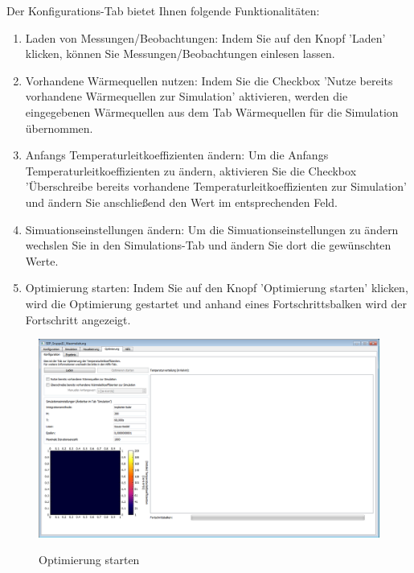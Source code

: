 Der Konfigurations-Tab bietet Ihnen folgende Funktionalitäten:\\
\begin{enumerate}
\item Laden von Messungen/Beobachtungen: Indem Sie auf den Knopf 'Laden' klicken, können Sie Messungen/Beobachtungen einlesen lassen.
\item Vorhandene Wärmequellen nutzen: Indem Sie die Checkbox 'Nutze bereits vorhandene Wärmequellen zur Simulation' aktivieren, werden die eingegebenen Wärmequellen aus dem Tab Wärmequellen für die Simulation übernommen.
\item Anfangs Temperaturleitkoeffizienten ändern: Um die Anfangs Temperaturleitkoeffizienten zu ändern, aktivieren Sie die Checkbox 'Überschreibe bereits vorhandene Temperaturleitkoeffizienten zur Simulation' und ändern Sie anschließend den Wert im entsprechenden Feld.
\item Simuationseinstellungen ändern: Um die Simuationseinstellungen zu ändern wechslen Sie in den Simulations-Tab und ändern Sie dort die gewünschten Werte.
\item Optimierung starten: Indem Sie auf den Knopf 'Optimierung starten' klicken, wird die Optimierung gestartet und anhand eines Fortschrittsbalken wird der Fortschritt angezeigt.
\end{enumerate}
\begin{figure}[H]
\centering
\includegraphics[scale=.25]{Bilder/OptimierungStarten.png}\\
\caption{Optimierung starten}
\label{OptimierungStarten}
\end{figure}

